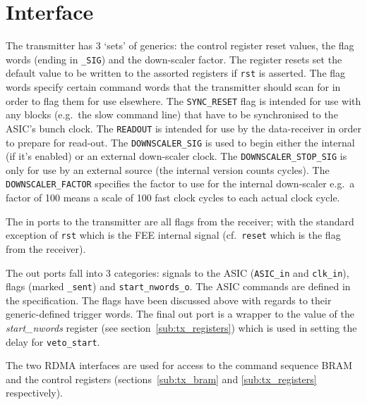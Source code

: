     \section{Interface} %
    \label{sub:tx_interface}
    The transmitter has 3 `sets' of generics: the control register reset values, the flag words (ending in \texttt{\_SIG}) and the down-scaler factor. The register resets set the default value to be written to the assorted registers if \texttt{rst} is asserted. The flag words specify certain command words that the transmitter should scan for in order to flag them for use elsewhere. The \texttt{\texttt{SYNC\_RESET}} flag is intended for use with any blocks (e.g.\ the slow command line) that have to be synchronised to the ASIC's bunch clock. The \texttt{READOUT} is intended for use by the data-receiver in order to prepare for read-out. The \texttt{DOWNSCALER\_SIG} is used to begin either the internal (if it's enabled) or an external down-scaler clock. The \texttt{DOWNSCALER\_STOP\_SIG} is only for use by an external source (the internal version counts cycles). The \texttt{DOWNSCALER\_FACTOR} specifies the factor to use for the internal down-scaler e.g.\ a factor of 100 means a scale of 100 fast clock cycles to each actual clock cycle.
    
    The in ports to the transmitter are all flags from the receiver; with the standard exception of \texttt{rst} which is the FEE internal signal (cf.\ \texttt{reset} which is the flag from the receiver).
    
    The out ports fall into 3 categories: signals to the ASIC (\texttt{ASIC\_in} and \texttt{clk\_in}), flags (marked \texttt{\_sent}) and \texttt{start\_nwords\_o}. The ASIC commands are defined in the specification. The flags have been discussed above with regards to their generic-defined trigger words. The final out port is a wrapper to the value of the \emph{start\_nwords} register (see section~\ref{sub:tx_registers}) which is used in setting the delay for \texttt{veto\_start}.
    
    The two RDMA interfaces are used for access to the command sequence BRAM and the control registers (sections~\ref{sub:tx_bram} and \ref{sub:tx_registers} respectively).
    
